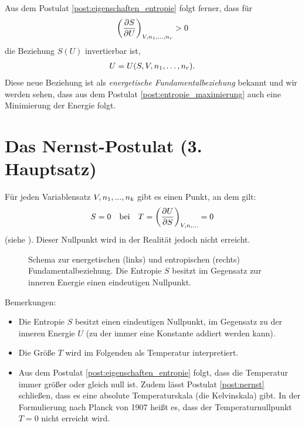 Aus dem Postulat \ref{post:eigenschaften_entropie} folgt ferner, dass für
\begin{align*}
    \left(\frac{\partial S}{\partial U}\right)_{V,n_1, \dots ,n_r} > 0
\end{align*}
die Beziehung $S(U)$ invertierbar ist,
\begin{align*}
    U = U(S,V,n_1, \dots,n_r).
\end{align*}
Diese neue Beziehung ist als \emph{energetische Fundamentalbeziehung} bekannt und wir werden sehen, dass aus dem Postulat \ref{post:entropie_maximierung} auch eine Minimierung der Energie folgt.



\section{Das Nernst-Postulat (3. Hauptsatz)}



\begin{postulate}
    \label{post:nernst}
    Für jeden Variablensatz $V,n_1,...,n_k$ gibt es einen Punkt, an dem gilt:
    \begin{align}
        \label{eq:nernst_postulat}
        S = 0 \quad \text{bei} \quad T =\left(\frac{\partial U}{\partial S}\right)_{V,n,...}=0
    \end{align}
    (siehe ). Dieser Nullpunkt wird in der Realität jedoch nicht erreicht. 
\end{postulate}

\begin{figure}[H]
    \centering
    \tfigSchemaFundamentalbeziehung
    \caption{Schema zur energetischen (links) und entropischen (rechts) Fundamentalbeziehung. Die Entropie $S$ besitzt im Gegensatz zur inneren Energie einen eindeutigen Nullpunkt.  }
    \label{fig:SchemaFundamentalbeziehung}
\end{figure}

Bemerkungen:
\begin{itemize}
    \item Die Entropie $S$ besitzt einen eindeutigen Nullpunkt, im Gegensatz zu der inneren Energie $U$ (zu der immer eine Konstante addiert werden kann).
    \item Die Größe $T$ wird im Folgenden als Temperatur interpretiert.
    \item Aus dem Postulat \ref{post:eigenschaften_entropie} folgt, dass die Temperatur immer größer oder gleich null ist. Zudem lässt Postulat \ref{post:nernst} schließen, dass es eine absolute Temperaturskala (die Kelvinskala) gibt.
    In der Formulierung nach Planck von 1907 heißt es, dass der Temperaturnullpunkt $T=0$ nicht erreicht wird.
\end{itemize}




